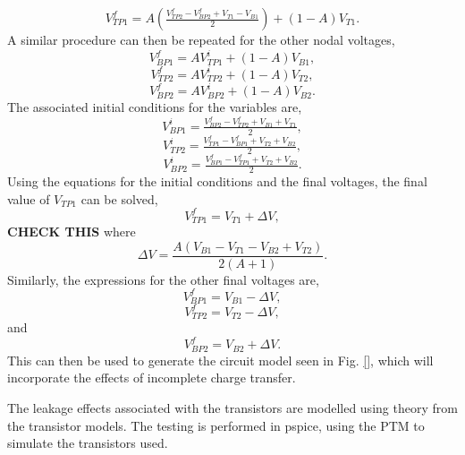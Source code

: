 \documentclass[conference]{IEEEtran}
\begin{document}
	\begin{equation}
	V_{TP1}^f = A\left(\tfrac{V_{TP2}^f - V_{BP2}^f + V_{T1} - V_{B1}}{2}\right) + (1-A)V_{T1}.
	\end{equation}
	A similar procedure can then be repeated for the other nodal voltages,
	\begin{equation}
	V_{BP1}^f = AV_{TP1}^i + (1-A)V_{B1},
	\end{equation}
	\begin{equation}
	V_{TP2}^f = AV_{TP2}^i + (1-A)V_{T2},
	\end{equation}
	\begin{equation}
	V_{BP2}^f = AV_{BP2}^i + (1-A)V_{B2}.
	\end{equation}
	The associated initial conditions for the variables are,
	\begin{equation}
	V_{BP1}^i = \tfrac{V_{BP2}^f - V_{TP2}^f + V_{B1} + V_{T1}}{2},
	\end{equation}
	\begin{equation}
	V_{TP2}^i = \tfrac{V_{TP1}^f - V_{BP1}^f + V_{T2} + V_{B2}}{2},
	\end{equation}
	\begin{equation}
	V_{BP2}^i = \tfrac{V_{BP1}^f - V_{TP1}^f + V_{T2} + V_{B2}}{2}.
	\end{equation}
	Using the equations for the initial conditions and the final voltages, the final value of $V_{TP1}$ can be solved,
	\begin{equation}
	V_{TP1}^f = V_{T1} + \Delta V, 
	\end{equation}
	\textbf{CHECK THIS}
	where 
	\begin{equation}
	\Delta V = \frac{A(V_{B1} - V_{T1} - V_{B2} + V_{T2})}{2(A+1)}.
	\end{equation}
	Similarly, the expressions for the other final voltages are,
	\begin{equation}
	V_{BP1}^f = V_{B1} - \Delta V,
	\end{equation}
	\begin{equation}
	V_{TP2}^f = V_{T2} - \Delta V,
	\end{equation}
	and
	\begin{equation}
	V_{BP2}^f = V_{B2} + \Delta V.
	\end{equation}
	This can then be used to generate the circuit model seen in Fig. \ref{}, which will incorporate the effects of incomplete charge transfer.
	
	
	
	The leakage effects associated with the transistors are modelled using theory from the \cite{} transistor models. The testing is performed in pspice, using the PTM to simulate the transistors used. 
	
	
\end{document}
